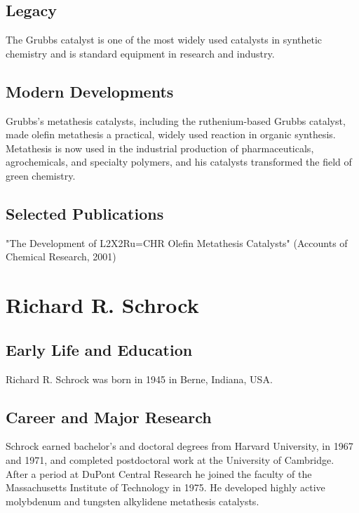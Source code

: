 \subsection*{Legacy}

The Grubbs catalyst is one of the most widely used catalysts in synthetic chemistry and is standard equipment in research and industry.

\subsection*{Modern Developments}

Grubbs's metathesis catalysts, including the ruthenium-based Grubbs catalyst, made olefin metathesis a practical, widely used reaction in organic synthesis. Metathesis is now used in the industrial production of pharmaceuticals, agrochemicals, and specialty polymers, and his catalysts transformed the field of green chemistry.

\subsection*{Selected Publications}

"The Development of L2X2Ru=CHR Olefin Metathesis Catalysts" (Accounts of Chemical Research, 2001)

\clearpage

\section{Richard R. Schrock}

\subsection*{Early Life and Education}

Richard R. Schrock was born in 1945 in Berne, Indiana, USA.

\subsection*{Career and Major Research}

Schrock earned bachelor's and doctoral degrees from Harvard University, in 1967 and 1971, and completed postdoctoral work at the University of Cambridge. After a period at DuPont Central Research he joined the faculty of the Massachusetts Institute of Technology in 1975. He developed highly active molybdenum and tungsten alkylidene metathesis catalysts.

